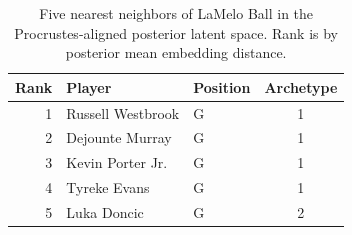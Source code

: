 \begin{table}[htbp]
  \centering\small
  \begin{tabular}{rllc}
    \toprule
    Rank & Player & Position & Archetype \\
    \midrule
    1 & Russell Westbrook & G & 1 \\
    2 & Dejounte Murray & G & 1 \\
    3 & Kevin Porter Jr. & G & 1 \\
    4 & Tyreke Evans & G & 1 \\
    5 & Luka Doncic & G & 2 \\
    \bottomrule
  \end{tabular}
  \caption{Five nearest neighbors of LaMelo Ball in the Procrustes-aligned posterior latent space. Rank is by posterior mean embedding distance.}
  \label{tab:LaMelo_Ball_neighbors}
\end{table}

